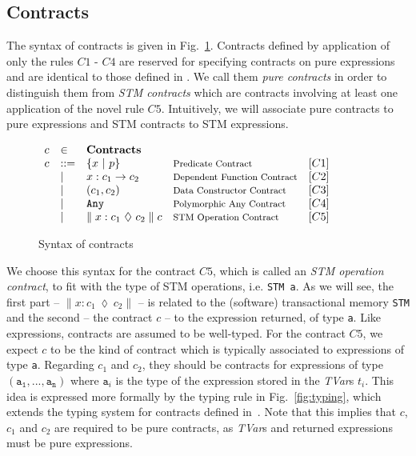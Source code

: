 \documentclass[submission,copyright,creativecommons]{eptcs}
\newcommand{\code}[1]{\textrm{{\tt #1}}}
\begin{document}
\subsection{Contracts}
\label{contracts}

\newcommand{\contractTM}[3]{\ensuremath{\parallel #1 \ \lozenge \ #2 \parallel} #3}


The syntax of contracts is given in Fig.~\ref{fig:contractsyntax}. Contracts defined by application of only the rules $C1$ - $C4$ are reserved for specifying contracts on pure expressions and are identical to those defined in \cite{static-contract-checking}. We call them \emph{pure contracts} in order to distinguish them from \emph{STM contracts} which are contracts involving at least one application of the novel rule $C5$. Intuitively, we will associate pure contracts to pure expressions and STM contracts to STM expressions. 

\begin{figure}[htb]
  \centering
\begin{math}
    \begin{array}{llllr}
      c & \in & \mbox{\textbf{Contracts}} \\
      c & ::= & \{ x \ | \ p \}        & \mbox{\footnotesize{Predicate Contract}} & [C1] \\ &  |  & x:c_1 \rightarrow c_2  & \mbox{\footnotesize{Dependent Function Contract}} & [C2]\\
        &  |  & (c_1,c_2)              & \mbox{\footnotesize{Data Constructor Contract}} & [C3]\\
        &  |  & \code{Any}             & \mbox{\footnotesize{Polymorphic Any Contract}} & [C4]\\
        &  |  & \contractTM{x : c_1}{c_2}{c}
                                       & \mbox{\footnotesize{STM Operation Contract}} & [C5]\\ \end{array}
  \end{math}\caption{Syntax of contracts}
  \label{fig:contractsyntax}
\end{figure}

 


We choose this syntax for the contract $C5$, which is called an \emph{STM operation contract}, to fit with the type of STM operations, i.e. \texttt{STM a}. As we will see, the first part -- $\contractTM{x : c_1}{c_2}{}$ -- is related to the (software) transactional memory \texttt{STM} and the second -- the contract $c$ -- to the expression returned, of type \texttt{a}. 
Like expressions, contracts are assumed to be well-typed. 
For the contract $C5$, we expect $c$ to be the kind of contract which is typically associated to expressions of type \texttt{a}. Regarding $c_1$ and $c_2$, they should be contracts for expressions of type $(\mathtt{a_1},...,\mathtt{a_n})$ where $\mathtt{a}_i$ is the type of the expression stored in the \emph{TVar}s $t_i$. 
This idea is expressed more formally by the typing rule in Fig.~\ref{fig:typing}, which extends the typing system for contracts defined in~\cite{static-contract-checking-thesis}.
Note that this implies that $c$, $c_1$ and $c_2$ are required to be pure contracts, as \emph{TVar}s and returned expressions must be pure expressions.
\end{document}
